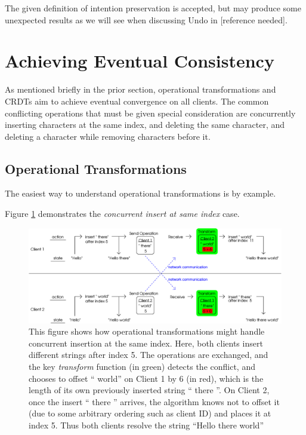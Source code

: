 \documentclass[12pt,a4paper,twoside,openright]{report}
\begin{document}
	The given definition of intention preservation is accepted, but may produce some unexpected results as we will see when discussing Undo in [reference needed].
	

\section{Achieving Eventual Consistency}

	As mentioned briefly in the prior section, operational transformations and CRDTs aim to achieve eventual convergence on all clients. The common conflicting operations that must be given special consideration are concurrently inserting characters at the same index, and deleting the same character, and deleting a character while removing characters before it.

	\subsection{Operational Transformations}
	
	The easiest way to understand operational transformations is by example.
	
	
	Figure \ref{fig:ot1} demonstrates the \textit{concurrent insert at same index} case.
	
	\begin{figure}[H]
	\centering
	\includegraphics[width=1\linewidth]{figs/ot1.eps}
	\caption[Operational Transformations -- concurrent insertion]{This figure shows how operational transformations might handle concurrent insertion at the same index. Here, both clients insert different strings after index 5. The operations are exchanged, and the key \textit{transform} function (in green) detects the conflict, and chooses to offset `` world'' on Client 1 by 6 (in red), which is the length of its own previously inserted string `` there ''. On Client 2, once the insert `` there '' arrives, the algorithm knows not to offset it (due to some arbitrary ordering such as client ID) and places it at index 5. Thus both clients resolve the string ``Hello there world''}
	\label{fig:ot1}
	\end{figure}
	
\end{document}
